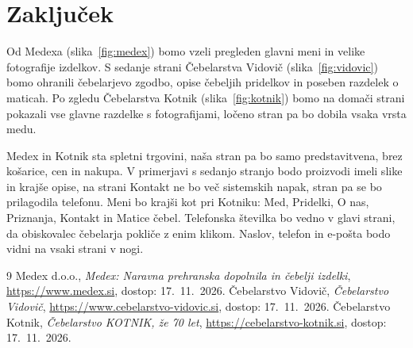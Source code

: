 \documentclass[11pt,a4paper]{article}
\begin{document}
\section{Zaključek}
Od Medexa (slika~\ref{fig:medex}) bomo vzeli pregleden glavni meni in velike fotografije izdelkov.
S sedanje strani Čebelarstva Vidovič (slika~\ref{fig:vidovic}) bomo ohranili čebelarjevo zgodbo, opise čebeljih pridelkov in poseben razdelek o maticah.
Po zgledu Čebelarstva Kotnik (slika~\ref{fig:kotnik}) bomo na domači strani pokazali vse glavne razdelke s fotografijami, ločeno stran pa bo dobila vsaka vrsta medu.

Medex in Kotnik sta spletni trgovini, naša stran pa bo samo predstavitvena, brez košarice, cen in nakupa.
V primerjavi s sedanjo stranjo bodo proizvodi imeli slike in krajše opise, na strani Kontakt ne bo več sistemskih napak, stran pa se bo prilagodila telefonu.
Meni bo krajši kot pri Kotniku: Med, Pridelki, O nas, Priznanja, Kontakt in Matice čebel. Telefonska številka bo vedno v glavi strani, da obiskovalec čebelarja pokliče z enim klikom.
Naslov, telefon in e-pošta bodo vidni na vsaki strani v nogi.

\begin{thebibliography}{9}
   Medex d.o.o., \emph{Medex: Naravna prehranska dopolnila in čebelji izdelki}, \url{https://www.medex.si}, dostop: 17.~11.~2026.
   Čebelarstvo Vidovič, \emph{Čebelarstvo Vidovič}, \url{https://www.cebelarstvo-vidovic.si}, dostop: 17.~11.~2026.
   Čebelarstvo Kotnik, \emph{Čebelarstvo KOTNIK, že 70 let}, \url{https://cebelarstvo-kotnik.si}, dostop: 17.~11.~2026.
\end{thebibliography}
\end{document}
